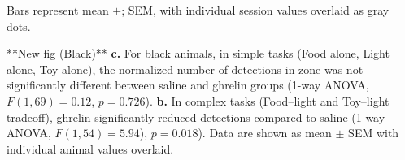 Bars represent mean $\pm$; SEM, with individual session values overlaid as gray dots.

**New fig (Black)** \textbf{c.} For black animals, in simple tasks (Food alone, Light alone, Toy alone), the normalized number of detections in zone was not significantly different between saline and ghrelin groups (1-way ANOVA, $F(1,69)=0.12$, $p=0.726$). \textbf{b.} In complex tasks (Food–light and Toy–light tradeoff), ghrelin significantly reduced detections compared to saline (1-way ANOVA, $F(1,54)=5.94$), $p=0.018$). Data are shown as mean $\pm$ SEM with individual animal values overlaid.